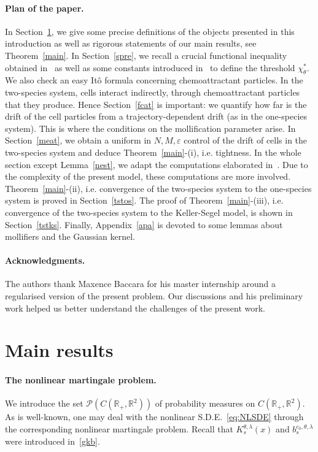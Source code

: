 \documentclass[11pt]{article}
\newcommand{\R}{\mathbb{R}}
\newcommand{\1}{\mathbbm{1}}
\newcommand{\Pp}{\mathcal P}
\newcommand{\e}{\varepsilon}
\newcommand{\vip}{\vskip5pt}
\begin{document}
\paragraph{Plan of the paper.}
In Section~\ref{secmr}, we give some precise definitions of the objects presented in this introduction as well as rigorous statements of our main results, see Theorem~\ref{main}.
\vip
In Section~\ref{spre}, we recall a crucial functional inequality obtained in~\cite{FT1} as well as some constants introduced in~\cite{FT1} to define the threshold $\chi_\theta^*$. We also check an easy Itô formula concerning chemoattractant particles.
\vip
In the two-species system, cells interact indirectly, through chemoattractant particles that they produce. Hence Section~\ref{fcat} is important: we quantify how far is the drift of the cell particles from a trajectory-dependent drift (as in the one-species system). This is where the conditions on the mollification parameter arise.
\vip
In Section~\ref{meat}, we obtain a uniform in $N,M,\e$ control  of the drift of cells in the two-species system
and deduce Theorem~\ref{main}-(i), i.e. tightness. In the whole section except Lemma~\ref{nest}, we adapt the computations elaborated in~\cite{FT1}. Due to the complexity of the present model, these computations are more involved.
\vip
Theorem~\ref{main}-(ii), i.e. convergence of the two-species system to the one-species system is proved in Section~\ref{tstos}.
\vip
The proof of Theorem~\ref{main}-(iii), i.e. convergence of the  two-species  system to the Keller-Segel model, is shown in Section~\ref{tstks}.
\vip
Finally, Appendix~\ref{apa} is devoted to some lemmas about mollifiers and the Gaussian kernel.

\paragraph{Acknowledgments.} The authors thank Maxence Baccara for his master internship around a regularised version of the present problem. Our discussions and his preliminary work helped us better understand the challenges of the present work.

\section{Main results}\label{secmr}


\paragraph{The nonlinear martingale problem.}
We introduce the set $\Pp(C(\R_+,\R^2))$ of probability measures on $C(\R_+,\R^2)$.
As is well-known, one may deal with the nonlinear S.D.E.~\eqref{eq:NLSDE} through the corresponding nonlinear martingale problem. Recall that $K^{\theta,\lambda}_{s}(x)$ and $b_s^{c_0,\theta,\lambda}$ were introduced in~\eqref{gkb}.
\end{document}
